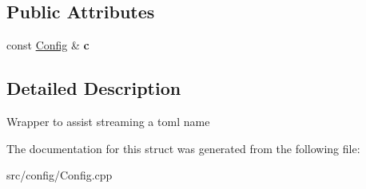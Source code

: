 \subsection*{Public Attributes}
\begin{DoxyCompactItemize}
\item 
\mbox{\label{structtoTomlName_ac218bcee1d45d3e7a13da755b42bf19a}} 
const \hyperlink{classtheoria_1_1config_1_1Config}{Config} \& {\bfseries c}
\end{DoxyCompactItemize}


\subsection{Detailed Description}
Wrapper to assist streaming a toml name 

The documentation for this struct was generated from the following file\+:\begin{DoxyCompactItemize}
\item 
src/config/Config.\+cpp\end{DoxyCompactItemize}
